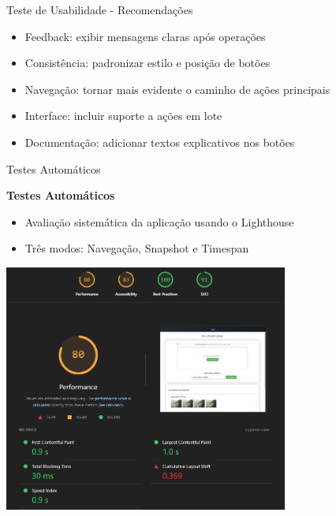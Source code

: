 \documentclass[landscape, 12pt]{beamer}
\begin{document}
\begin{frame}{Teste de Usabilidade - Recomendações}
    \begin{itemize}
        \item Feedback: exibir mensagens claras após operações
        \item Consistência: padronizar estilo e posição de botões
        \item Navegação: tornar mais evidente o caminho de ações principais
        \item Interface: incluir suporte a ações em lote
        \item Documentação: adicionar textos explicativos nos botões
    \end{itemize}
\end{frame}

\begin{frame}{Testes Automáticos}
    \begin{center}
        \textbf{Testes Automáticos}
    \end{center}
    \vspace{0.5cm}
    \begin{itemize}
        \item Avaliação sistemática da aplicação usando o Lighthouse
        \item Três modos: Navegação, Snapshot e Timespan
    \end{itemize}
    \vspace{0.5cm}
    \begin{center}
        \includegraphics[width=0.7\textwidth]{../figures/hci/testes_automaticos.png}
    \end{center}
\end{frame}
\end{document}
